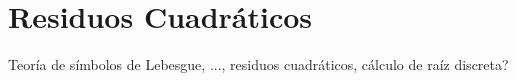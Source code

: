 \chapter{Residuos Cuadráticos}\label{ch:qr} 


Teoría de símbolos de Lebesgue, ..., residuos cuadráticos, cálculo de raíz discreta?